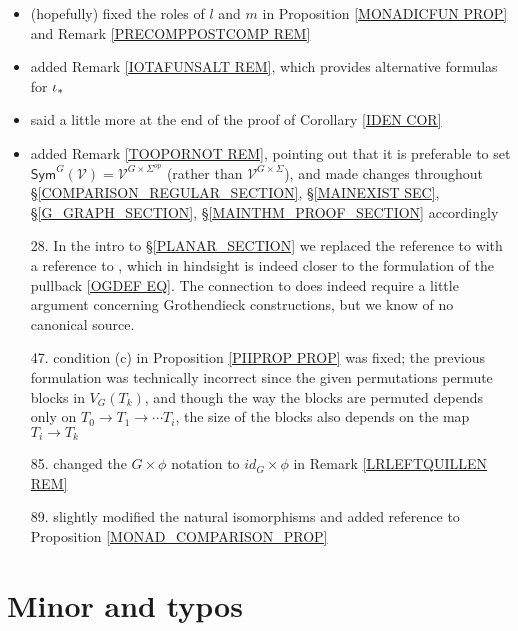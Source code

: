 \documentclass{article}
\begin{document}
\begin{itemize}
	\item (hopefully) fixed the roles of $l$ and $m$ in 
	Proposition \ref{MONADICFUN PROP} and
	Remark \ref{PRECOMPPOSTCOMP REM}
	
	\item added Remark \ref{IOTAFUNSALT REM},
	which provides alternative formulas for
	$\iota_{\**}$
	
	\item said a little more at the end of the proof of
	Corollary \ref{IDEN COR}
	
	\item added Remark \ref{TOOPORNOT REM}, pointing out that it is preferable to set
	$\mathsf{Sym}^G(\mathcal{V}) = 
	\mathcal{V}^{G \times \Sigma^{op}}$
	(rather than $\mathcal{V}^{G \times \Sigma}$),
	and made changes throughout 
	\S \ref{COMPARISON_REGULAR_SECTION},
	\S \ref{MAINEXIST SEC},
	\S \ref{G_GRAPH_SECTION},
	\S \ref{MAINTHM_PROOF_SECTION}
	accordingly
	
	
	\item[28.] In the intro to \S \ref{PLANAR_SECTION}
	we replaced the reference to 
	\cite[Prop. 5.47]{Pe17}
	with a reference to 
	\cite[Def. 5.44]{Pe17},
	which in hindsight is indeed closer 
	to the formulation of the pullback \eqref{OGDEF EQ}.
	The connection to \cite[Prop. 5.47]{Pe17}
	does indeed require a little argument concerning Grothendieck constructions,
	but we know of no canonical source.
	
	\item[47.] condition (c) in Proposition \ref{PIIPROP PROP}
	was fixed; the previous formulation was technically incorrect since the given permutations
	permute blocks in $V_G(T_k)$,
	and though the way the blocks
	are permuted depends only on 
	$T_0 \to T_1 \to \cdots T_i$,
	the size of the blocks also depends on the map 
	$T_i \to T_k$ 
	
	\item[85.] changed the $G \times \phi$ notation 
	to $id_G \times \phi$ in Remark \ref{LRLEFTQUILLEN REM}
	
	\item[89.] slightly modified the natural isomorphisms and added reference to Proposition \ref{MONAD_COMPARISON_PROP} 
\end{itemize}


\section{Minor and typos} 
\end{document}
